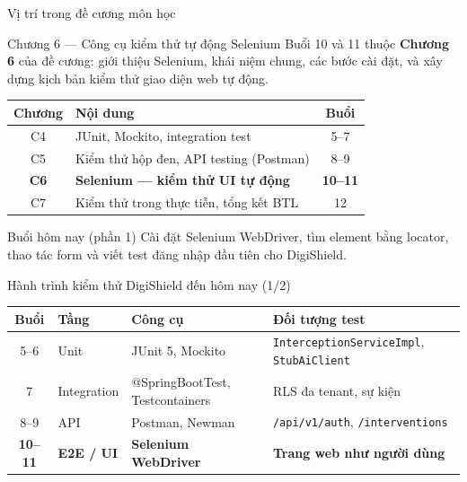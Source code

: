 \documentclass[aspectratio=169,12pt]{beamer}
\begin{document}
\begin{frame}{Vị trí trong đề cương môn học}
  \begin{block}{Chương 6 --- Công cụ kiểm thử tự động Selenium}
    Buổi 10 và 11 thuộc \textbf{Chương 6} của đề cương:
    giới thiệu Selenium, khái niệm chung, các bước cài đặt,
    và xây dựng kịch bản kiểm thử giao diện web tự động.
  \end{block}

  \begin{center}
  \small
  \begin{tabular}{clc}
    \toprule
    \textbf{Chương} & \textbf{Nội dung} & \textbf{Buổi} \\
    \midrule
    C4 & JUnit, Mockito, integration test & 5--7 \\
    C5 & Kiểm thử hộp đen, API testing (Postman) & 8--9 \\
    \textbf{C6} & \textbf{Selenium --- kiểm thử UI tự động} & \textbf{10--11} \\
    C7 & Kiểm thử trong thực tiễn, tổng kết BTL & 12 \\
    \bottomrule
  \end{tabular}
  \end{center}
  \vspace{-0.4em}

  \begin{exampleblock}{Buổi hôm nay (phần 1)}
    Cài đặt Selenium WebDriver, tìm element bằng locator,
    thao tác form và viết test đăng nhập đầu tiên cho DigiShield.
  \end{exampleblock}
\end{frame}

\begin{frame}{Hành trình kiểm thử DigiShield đến hôm nay (1/2)}
  \begin{center}
  \small
  \setlength{\tabcolsep}{4pt}
  \begin{tabularx}{\textwidth}{cllX}
    \toprule
    \textbf{Buổi} & \textbf{Tầng} & \textbf{Công cụ} & \textbf{Đối tượng test} \\
    \midrule
    5--6 & Unit & JUnit 5, Mockito & \texttt{Interception\allowbreak ServiceImpl}, \texttt{StubAiClient} \\
    7 & Integration & @SpringBootTest, Testcontainers & RLS đa tenant, sự kiện \\
    8--9 & API & Postman, Newman & \texttt{/api/v1/auth}, \texttt{/interventions} \\
    \textbf{10--11} & \textbf{E2E / UI} & \textbf{Selenium WebDriver} & \textbf{Trang web như người dùng} \\
    \bottomrule
  \end{tabularx}
  \end{center}
\end{frame}
\end{document}
